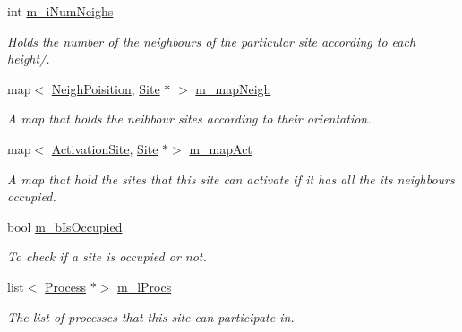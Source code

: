 \begin{DoxyCompactItemize}
\mbox{\label{classSurfaceTiles_1_1Site_ab38a2f2e5d2422a15d02cd8504eb4c4d}} 
int \mbox{\hyperlink{classSurfaceTiles_1_1Site_ab38a2f2e5d2422a15d02cd8504eb4c4d}{m\+\_\+i\+Num\+Neighs}}
\begin{DoxyCompactList}\small\item\em Holds the number of the neighbours of the particular site according to each height/. \end{DoxyCompactList}\item 
\mbox{\label{classSurfaceTiles_1_1Site_a456b3c1b06dea76479ba47ade95c1415}} 
map$<$ \mbox{\hyperlink{classSurfaceTiles_1_1Site_a6cef4c767e7aa8320658fb3cd0fa3b1c}{Neigh\+Poisition}}, \mbox{\hyperlink{classSurfaceTiles_1_1Site}{Site}} $\ast$ $>$ \mbox{\hyperlink{classSurfaceTiles_1_1Site_a456b3c1b06dea76479ba47ade95c1415}{m\+\_\+map\+Neigh}}
\begin{DoxyCompactList}\small\item\em A map that holds the neihbour sites according to their orientation. \end{DoxyCompactList}\item 
\mbox{\label{classSurfaceTiles_1_1Site_a9c041594dc0e82a5fcfbb4cfef6ecacc}} 
map$<$ \mbox{\hyperlink{classSurfaceTiles_1_1Site_a459d18c54ed5cbe4db365a2a0a4b6492}{Activation\+Site}}, \mbox{\hyperlink{classSurfaceTiles_1_1Site}{Site}} $\ast$$>$ \mbox{\hyperlink{classSurfaceTiles_1_1Site_a9c041594dc0e82a5fcfbb4cfef6ecacc}{m\+\_\+map\+Act}}
\begin{DoxyCompactList}\small\item\em A map that hold the sites that this site can activate if it has all the its neighbours occupied. \end{DoxyCompactList}\item 
\mbox{\label{classSurfaceTiles_1_1Site_a9d29cd7955a2569603cd83d7f5bbe33a}} 
bool \mbox{\hyperlink{classSurfaceTiles_1_1Site_a9d29cd7955a2569603cd83d7f5bbe33a}{m\+\_\+b\+Is\+Occupied}}
\begin{DoxyCompactList}\small\item\em To check if a site is occupied or not. \end{DoxyCompactList}\item 
\mbox{\label{classSurfaceTiles_1_1Site_af1acda0a0738bad91666dbc8055c824d}} 
list$<$ \mbox{\hyperlink{classMicroProcesses_1_1Process}{Process}} $\ast$$>$ \mbox{\hyperlink{classSurfaceTiles_1_1Site_af1acda0a0738bad91666dbc8055c824d}{m\+\_\+l\+Procs}}
\begin{DoxyCompactList}\small\item\em The list of processes that this site can participate in. \end{DoxyCompactList}\end{DoxyCompactItemize}


